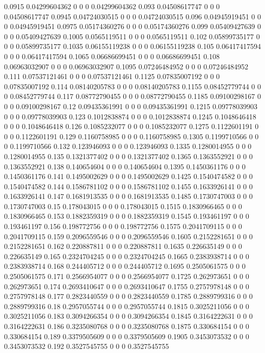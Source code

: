 {0.0915 0.04299604362 0 0 0 0.04299604362
0.093 0.04508617747 0 0 0 0.04508617747
0.0945 0.04724030515 0 0 0 0.04724030515
0.096 0.04945919451 0 0 0 0.04945919451
0.0975 0.05174360276 0 0 0 0.05174360276
0.099 0.05409427639 0 0 0 0.05409427639
0.1005 0.0565119511 0 0 0 0.0565119511
0.102 0.05899735177 0 0 0 0.05899735177
0.1035 0.06155119238 0 0 0 0.06155119238
0.105 0.06417417594 0 0 0 0.06417417594
0.1065 0.06686699451 0 0 0 0.06686699451
0.108 0.06963032907 0 0 0 0.06963032907
0.1095 0.07246484952 0 0 0 0.07246484952
0.111 0.07537121461 0 0 0 0.07537121461
0.1125 0.07835007192 0 0 0 0.07835007192
0.114 0.08140205783 0 0 0 0.08140205783
0.1155 0.08452779744 0 0 0 0.08452779744
0.117 0.08772790455 0 0 0 0.08772790455
0.1185 0.09100298167 0 0 0 0.09100298167
0.12 0.09435361991 0 0 0 0.09435361991
0.1215 0.09778039903 0 0 0 0.09778039903
0.123 0.1012838874 0 0 0 0.1012838874
0.1245 0.1048646418 0 0 0 0.1048646418
0.126 0.1085232077 0 0 0 0.1085232077
0.1275 0.1122601191 0 0 0 0.1122601191
0.129 0.1160758985 0 0 0 0.1160758985
0.1305 0.1199710566 0 0 0 0.1199710566
0.132 0.123946093 0 0 0 0.123946093
0.1335 0.1280014955 0 0 0 0.1280014955
0.135 0.1321377402 0 0 0 0.1321377402
0.1365 0.1363552921 0 0 0 0.1363552921
0.138 0.140654604 0 0 0 0.140654604
0.1395 0.1450361176 0 0 0 0.1450361176
0.141 0.1495002629 0 0 0 0.1495002629
0.1425 0.1540474582 0 0 0 0.1540474582
0.144 0.1586781102 0 0 0 0.1586781102
0.1455 0.1633926141 0 0 0 0.1633926141
0.147 0.1681913535 0 0 0 0.1681913535
0.1485 0.1730747003 0 0 0 0.1730747003
0.15 0.178043015 0 0 0 0.178043015
0.1515 0.1830966465 0 0 0 0.1830966465
0.153 0.1882359319 0 0 0 0.1882359319
0.1545 0.193461197 0 0 0 0.193461197
0.156 0.198772756 0 0 0 0.198772756
0.1575 0.2041709115 0 0 0 0.2041709115
0.159 0.2096559546 0 0 0 0.2096559546
0.1605 0.2152281651 0 0 0 0.2152281651
0.162 0.220887811 0 0 0 0.220887811
0.1635 0.226635149 0 0 0 0.226635149
0.165 0.2324704245 0 0 0 0.2324704245
0.1665 0.2383938714 0 0 0 0.2383938714
0.168 0.244405712 0 0 0 0.244405712
0.1695 0.2505061575 0 0 0 0.2505061575
0.171 0.2566954077 0 0 0 0.2566954077
0.1725 0.262973651 0 0 0 0.262973651
0.174 0.2693410647 0 0 0 0.2693410647
0.1755 0.2757978148 0 0 0 0.2757978148
0.177 0.2823440559 0 0 0 0.2823440559
0.1785 0.2889799316 0 0 0 0.2889799316
0.18 0.2957055744 0 0 0 0.2957055744
0.1815 0.3025211056 0 0 0 0.3025211056
0.183 0.3094266354 0 0 0 0.3094266354
0.1845 0.3164222631 0 0 0 0.3164222631
0.186 0.3235080768 0 0 0 0.3235080768
0.1875 0.330684154 0 0 0 0.330684154
0.189 0.3379505609 0 0 0 0.3379505609
0.1905 0.3453073532 0 0 0 0.3453073532
0.192 0.3527545755 0 0 0 0.3527545755
}
